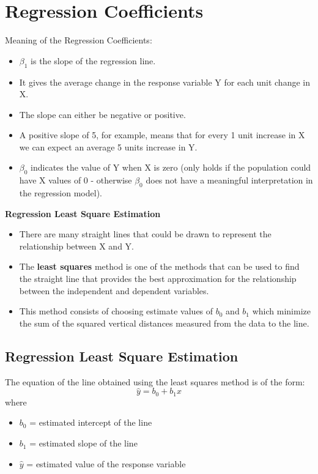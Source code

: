 \documentclass[]{report}
\begin{document}
	
	

	

	





\section{Regression Coefficients} Meaning of the Regression Coefficients:
\begin{itemize} \item $\beta_1$ is the slope of the regression line.
	\item It gives the average change in the response variable Y for each unit
	change in X.
	\item The slope can either be negative or positive.
	\item A positive slope of 5, for example, means that for every 1 unit increase
	in X we can expect an average 5 units increase in Y.
	\item $\beta_0$ indicates the value of Y when X is zero (only holds if the population could
	have X values of 0 - otherwise $\beta_0$ does not have a meaningful interpretation
	in the regression model).
\end{itemize}


\textbf{Regression Least Square Estimation}
\begin{itemize}
	\item There are many straight lines that could be drawn to represent the
	relationship between X and Y.
	\item The \textbf{least squares} method is one of the methods that can be used to find
	the straight line that provides the best approximation for the relationship
	between the independent and dependent variables.
	\item This method consists of choosing estimate values of $b_0$ and $b_1$ which minimize the sum
	of the squared vertical distances measured from the data to the line.
\end{itemize}

\subsection{Regression Least Square Estimation}
The
equation of the line obtained using the least squares method is of the form:
\[ \hat{y} = b_0 + b_1x \]
where
\begin{itemize}
	\item $b_0$ = estimated intercept of the line
	\item $b_1$ = estimated slope of the line
	\item $\hat{y}$ = estimated value of the response variable
\end{itemize}
\end{document}
